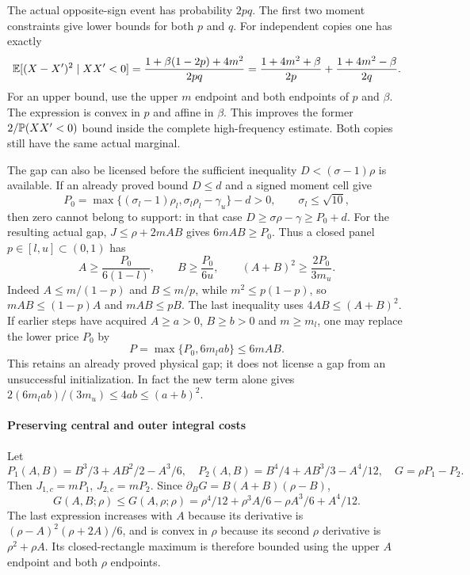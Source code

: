 The actual opposite-sign event has probability $2pq$.
The first two moment constraints give lower bounds for both $p$ and $q$.
For independent copies one has exactly
\[
 \mathbb E[(X-X')^2\mid XX'<0]
 =\frac{1+\beta(1-2p)+4m^2}{2pq}
 =\frac{1+4m^2+\beta}{2p}
  +\frac{1+4m^2-\beta}{2q}.
\]
For an upper bound, use the upper $m$ endpoint and both endpoints of
$p$ and $\beta$. The expression is convex in $p$ and affine in $\beta$.
This improves the former $2/\mathbb P(XX'<0)$ bound inside the complete high-frequency
estimate. Both copies still have the same actual marginal.

The gap can also be licensed before the sufficient inequality
$D<(\sigma-1)\rho$ is available. If an already proved bound $D\le d$
and a signed moment cell give
\[
 P_0=\max\{(\sigma_l-1)\rho_l,\sigma_l\rho_l-\gamma_u\}-d>0,
 \qquad \sigma_l\le\sqrt{10},
\]
then zero cannot belong to support: in that case
$D\ge\sigma\rho-\gamma\ge P_0+d$.
For the resulting actual gap, $J\le\rho+2mAB$ gives
$6mAB\ge P_0$. Thus a closed panel $p\in[l,u]\subset(0,1)$ has
\begin{equation}\label{ms:fourier:rescore:eq:general-endpoint-floors}
 A\ge\frac{P_0}{6(1-l)},\qquad B\ge\frac{P_0}{6u},\qquad
 (A+B)^2\ge\frac{2P_0}{3m_u}.
\end{equation}
Indeed $A\le m/(1-p)$ and $B\le m/p$, while
$m^2\le p(1-p)$, so $mAB\le(1-p)A$ and $mAB\le pB$.
The last inequality uses $4AB\le(A+B)^2$.
If earlier steps have acquired $A\ge a>0$, $B\ge b>0$ and $m\ge m_l$,
one may replace the lower price $P_0$ by
\begin{equation}\label{ms:fourier:rescore:eq:retained-endpoint-product}
 P=\max\{P_0,6m_l a b\}\le6mAB.
\end{equation}
This retains an already proved physical gap; it does not license a gap
from an unsuccessful initialization. In fact the new term alone gives
$2(6m_l a b)/(3m_u)\le4ab\le(a+b)^2$.

\paragraph{Preserving central and outer integral costs}
Let
\[
 P_1(A,B)=B^3/3+AB^2/2-A^3/6,\quad
 P_2(A,B)=B^4/4+AB^3/3-A^4/12,\quad G=\rho P_1-P_2.
\]
Then $J_{1,c}=mP_1$, $J_{2,c}=mP_2$. Since
$\partial_BG=B(A+B)(\rho-B)$,
\[
 G(A,B;\rho)\le G(A,\rho;\rho)
 =\rho^4/12+\rho^3A/6-\rho A^3/6+A^4/12.
\]
The last expression increases with $A$ because its derivative is
$(\rho-A)^2(\rho+2A)/6$, and is convex in $\rho$ because its second
$\rho$ derivative is $\rho^2+\rho A$. Its closed-rectangle maximum is
therefore bounded using the upper $A$ endpoint and both $\rho$ endpoints.

